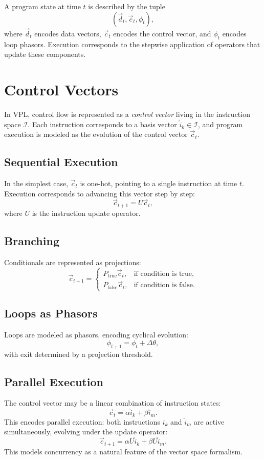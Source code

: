 \documentclass[12pt]{article}
\begin{document}
A program state at time $t$ is described by the tuple
\[
(\vec{d}_t, \vec{c}_t, \phi_t),
\]
where $\vec{d}_t$ encodes data vectors, $\vec{c}_t$ encodes the control vector,
and $\phi_t$ encodes loop phasors. Execution corresponds to the stepwise
application of operators that update these components.

\section{Control Vectors}
In VPL, control flow is represented as a \emph{control vector} living in the
instruction space $\mathcal{I}$. Each instruction corresponds to a basis vector
$\hat{i}_k \in \mathcal{I}$, and program execution is modeled as the evolution
of the control vector $\vec{c}_t$.

\subsection{Sequential Execution}
In the simplest case, $\vec{c}_t$ is one-hot, pointing to a single instruction
at time $t$. Execution corresponds to advancing this vector step by step:
\[
\vec{c}_{t+1} = U \vec{c}_t,
\]
where $U$ is the instruction update operator.

\subsection{Branching}
Conditionals are represented as projections:
\[
\vec{c}_{t+1} =
\begin{cases}
P_{\mathrm{true}} \vec{c}_t, & \text{if condition is true}, \\
P_{\mathrm{false}} \vec{c}_t, & \text{if condition is false}.
\end{cases}
\]

\subsection{Loops as Phasors}
Loops are modeled as phasors, encoding cyclical evolution:
\[
\phi_{t+1} = \phi_t + \Delta\theta,
\]
with exit determined by a projection threshold.

\subsection{Parallel Execution}
The control vector may be a linear combination of instruction states:
\[
\vec{c}_t = \alpha \hat{i}_k + \beta \hat{i}_m.
\]
This encodes parallel execution: both instructions $\hat{i}_k$ and $\hat{i}_m$
are active simultaneously, evolving under the update operator:
\[
\vec{c}_{t+1} = \alpha U \hat{i}_k + \beta U \hat{i}_m.
\]
This models concurrency as a natural feature of the vector space formalism.
\end{document}
